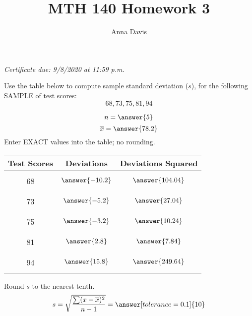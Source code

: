 \documentclass{ximera}
\author{Anna Davis} \title{MTH 140 Homework 3}
\begin{document}
\begin{abstract}

\end{abstract}
\maketitle
 \textit{Certificate due: 9/8/2020 at 11:59 p.m.}
\begin{problem}\label{prob:140hom3prob1}

Use the table below to compute sample standard deviation ($s$), for the following SAMPLE of test scores:
$$68, 73, 75, 81, 94$$

$$n=\answer{5}$$
$$\overline{x}=\answer{78.2}$$
Enter EXACT values into the table; no rounding.
\begin{center}
\begin{tabular}{|c|c|c|}
Test Scores & Deviations & Deviations Squared  \\
 \hline
 \hline
   & &\\
 68 &$\answer{-10.2}$  & $\answer{104.04}$ \\
  & &\\
  \hline
   & &\\
 73 &$\answer{-5.2}$  & $\answer{27.04}$\\
  & &\\
 \hline
  & &\\
 75 &$\answer{-3.2}$ &$\answer{10.24}$ \\
  & &\\
 \hline
  & &\\
 81 &$\answer{2.8}$  &$\answer{7.84}$ \\
  & &\\
 \hline
  & &\\
 94 &$\answer{15.8}$  &$\answer{249.64}$ \\
  & &\\
 \hline
  
\end{tabular}
\end{center}
Round $s$ to the nearest tenth.
$$s =\sqrt{\frac{\sum (x-\overline{x})^2}{n-1}}=\answer[tolerance=0.1]{10}$$
 \end{problem}
\end{document}
